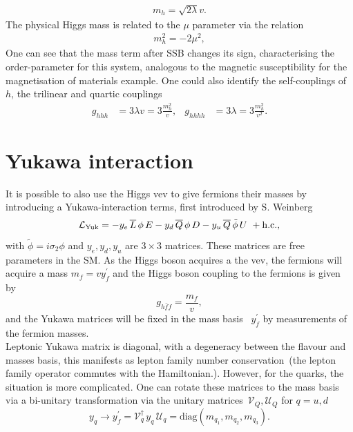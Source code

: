 \begin{align}
  m_h =\sqrt{2 \lambda} v .
\end{align}
The physical Higgs mass is related to the $\mu$ parameter via the relation
\begin{align}
	m_h ^2 =-2 \mu^2,
\end{align}
One can see that the mass term after SSB changes its sign, characterising the order-parameter for this system,  analogous to the magnetic susceptibility for the magnetisation of materials example. 
One could also identify the self-couplings of~$h$, the trilinear and quartic couplings 
\begin{align}
    g_{hhh}&=3\lambda v =3\frac{m_h^2}{v}, & g_{hhhh}&= 3 \lambda = 3\frac{m_h^2}{v^2}.
\end{align}
\section{Yukawa interaction}
It is possible to also use the Higgs vev to give fermions their masses by introducing a Yukawa-interaction terms, first introduced by S. Weinberg~\cite{PhysRevLett.19.1264}
\begin{equation}
    \mathcal{L}_{\mathrm{Yuk}}= -y_{e} \, \overline{L} \, \phi \, E 
- y_{d} \, \overline{Q} \, \phi \, D
- y_u \, \overline{Q} \, \tilde{\phi} \, U   \ + \mathrm{h.c.},
\label{lag-yuk}
\end{equation}
with $ \tilde{\phi}= i\sigma_2 \phi$ and $ y_e, y_d, y_u$ are $3\times 3$ matrices. These matrices are free parameters in the SM. As the Higgs boson acquires a the vev, the fermions will acquire a mass $m_f= vy^\prime_f$ and the Higgs boson coupling to the fermions is given by
\begin{equation}
	g_{h\bar{f}f} = \frac{m_f}{v},
\end{equation}
 and the Yukawa matrices will be fixed in the mass basis ~$y^\prime_f$ by measurements of the fermion masses.\\  Leptonic Yukawa matrix is diagonal, with a degeneracy between the flavour and masses basis, this manifests as lepton family number conservation~(the lepton family operator commutes with the Hamiltonian.). However, for the quarks, the situation is more complicated. One can rotate these matrices to the mass basis via a bi-unitary transformation via the unitary matrices~$ \mathcal{V}_Q, \mathcal{U}_Q$ for $ q= u,d$
\begin{equation}
    y_{q} \longrightarrow y^\prime_f= \mathcal{V}^\dagger_{q} \,y_q\, \mathcal{U}_{q} = \text{diag}\left(m_{q_1}, m_{q_2},m_{q_3}\right).
\end{equation}
